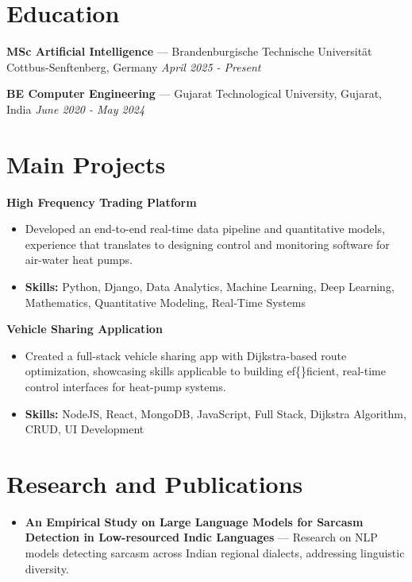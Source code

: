 \documentclass[a4paper,10pt]{article}
\begin{document}
\section*{Education}
\textbf{MSc Artificial Intelligence} — Brandenburgische Technische Universität Cottbus-Senftenberg, Germany \hfill \textit{April 2025 - Present}\par
\vspace{1.5pt}
\textbf{BE Computer Engineering} — Gujarat Technological University, Gujarat, India \hfill \textit{June 2020 - May 2024}\par

\section*{Main Projects}
\textbf{High Frequency Trading Platform}\par
\vspace{1pt}
\begin{itemize}
  \item Developed an end-to-end real-time data pipeline and quantitative models, experience that translates to designing control and monitoring software for air-water heat pumps.
  \item \textbf{Skills:} Python, Django, Data Analytics, Machine Learning, Deep Learning, Mathematics, Quantitative Modeling, Real-Time Systems
\end{itemize}
\vspace{3pt}
\textbf{Vehicle Sharing Application}\par
\vspace{1pt}
\begin{itemize}
  \item Created a full-stack vehicle sharing app with Dijkstra-based route optimization, showcasing skills applicable to building ef\{\}ficient, real-time control interfaces for heat-pump systems.
  \item \textbf{Skills:} NodeJS, React, MongoDB, JavaScript, Full Stack, Dijkstra Algorithm, CRUD, UI Development
\end{itemize}

\section*{Research and Publications}
\begin{itemize}
\item \textbf{An Empirical Study on Large Language Models for Sarcasm Detection in Low-resourced Indic Languages} — Research on NLP models detecting sarcasm across Indian regional dialects, addressing linguistic diversity.
\end{itemize}
\end{document}
